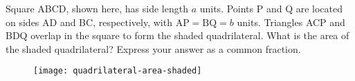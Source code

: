 Square ABCD, shown here, has side length $a$ units. Points P and Q are located on sides AD and BC, respectively, with $\text{AP}=\text{BQ}=b$ units. Triangles ACP and BDQ overlap in the square to form the shaded quadrilateral. What is the area of the shaded quadrilateral? Express your answer as a common fraction. 

\begin{figure}[H]
\centering
\texttt{[image: quadrilateral-area-shaded]}
\end{figure}

